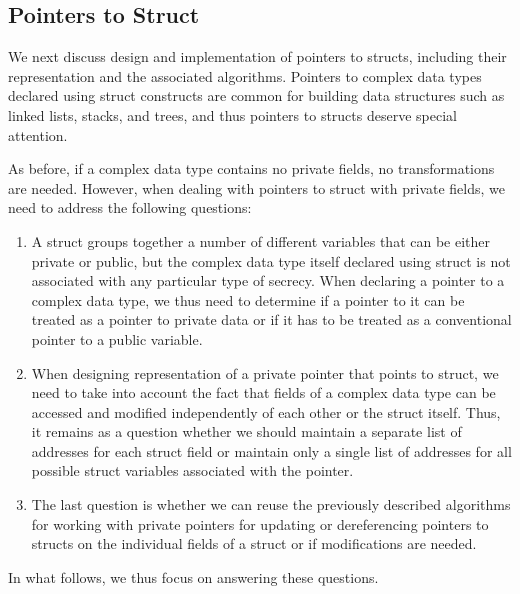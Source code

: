 \documentclass[11pt]{article}
\begin{document}
\subsection{Pointers to Struct}
\label{sec:struct}

We next discuss design and implementation of pointers to structs, including
their representation and the associated algorithms.  Pointers to complex
data types declared using struct constructs are common for building data
structures such as linked lists, stacks, and trees, and thus pointers to
structs deserve special attention. 

As before, if a complex data type contains no private fields, no
transformations are needed. However, when dealing with pointers to struct
with private fields, we need to address the following questions:
\begin{enumerate}
  \item A struct groups together a number of different variables that can be
    either private or public, but the complex data type itself declared
    using struct is not associated with any particular type of secrecy. When
    declaring a pointer to a complex data type, we thus need to
    determine if a pointer to it can be treated as a pointer to private
    data or if it has to be treated as a conventional pointer to a public
    variable.
  \item When designing representation of a private pointer that points to
    struct, we need to take into account the fact that fields of a complex
    data type can be accessed and modified independently of each other or
    the struct itself. Thus, it remains as a question whether we should
    maintain a separate list of addresses for each struct field or maintain
    only a single list of addresses for all possible struct variables
    associated with the pointer.
  \item The last question is whether we can reuse the previously described
    algorithms for working with private pointers for updating or
    dereferencing pointers to structs on the individual fields of a struct
    or if modifications are needed.
\end{enumerate}    
In what follows, we thus focus on answering these questions.
    
\end{document}
